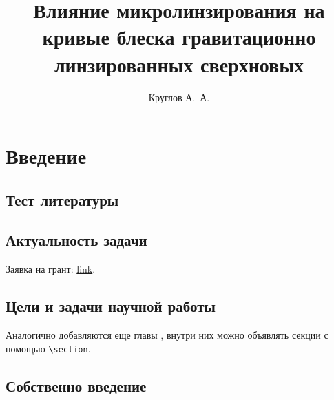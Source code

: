 \documentclass{mipt-thesis-bs}
\title{Влияние микролинзирования на кривые
           блеска гравитационно линзированных сверхновых}
\author{Круглов А.\ А.}
\begin{document}
    \frontmatter
    
    \titlecontents
    
    \mainmatter


\chapter{Введение}

    \section{Тест литературы}
    \cite{gravlensbook}
    \cite{kelly2014}
    \cite{treu2015}
    \cite{rodney2016}
    \cite{gl_all}
    \cite{moresuyu2017}
    \cite{pierelrodney2019}
    \cite{dobler2015}
    \cite{doblerkeeton2006}
    \cite{refsdalstabell1991}
    \cite{refsdal1964}
    \cite{narbart}
    
    \section{Актуальность задачи}
    Заявка на грант: \href{https://docs.google.com/document/d/1LeG-XjcpTT6cA9TJIDq61qVxFLF8IR38VrDoK6hkXco/edit?ts=5b23a829#}{link}.
    
    \section{Цели и задачи научной работы}
    Аналогично добавляются \cite{langmuir26} еще главы \cite{adams1995hitchhiker}, внутри них можно объявлять секции с помощью \verb|\section|.
    
    \section{Собственно введение}
    

    \backmatter

    \printbib
    
    
\end{document}
